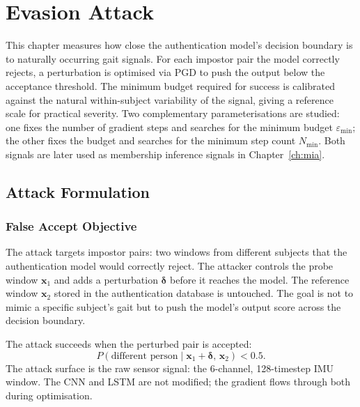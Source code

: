 \chapter{Evasion Attack}
\label{ch:evasion}


This chapter measures how close the authentication model's decision boundary is to naturally occurring gait signals. For each impostor pair the model correctly rejects, a perturbation is optimised via PGD to push the output below the acceptance threshold. The minimum budget required for success is calibrated against the natural within-subject variability of the signal, giving a reference scale for practical severity. Two complementary parameterisations are studied: one fixes the number of gradient steps and searches for the minimum budget $\varepsilon_\text{min}$; the other fixes the budget and searches for the minimum step count $N_\text{min}$. Both signals are later used as membership inference signals in Chapter~\ref{ch:mia}.

\section{Attack Formulation}
\label{sec:ev_formulation}

\subsection{False Accept Objective}
\label{ssec:ev_objective}

The attack targets impostor pairs: two windows from different subjects that the authentication model would correctly reject. The attacker controls the probe window $\mathbf{x}_1$ and adds a perturbation $\boldsymbol{\delta}$ before it reaches the model. The reference window $\mathbf{x}_2$ stored in the authentication database is untouched. The goal is not to mimic a specific subject's gait but to push the model's output score across the decision boundary.

The attack succeeds when the perturbed pair is accepted:
\begin{equation}
  P\!\left(\text{different person} \mid \mathbf{x}_1 + \boldsymbol{\delta},\,
  \mathbf{x}_2\right) < 0.5.
\end{equation}
The attack surface is the raw sensor signal: the 6-channel, 128-timestep IMU window. The CNN and LSTM are not modified; the gradient flows through both during optimisation.

